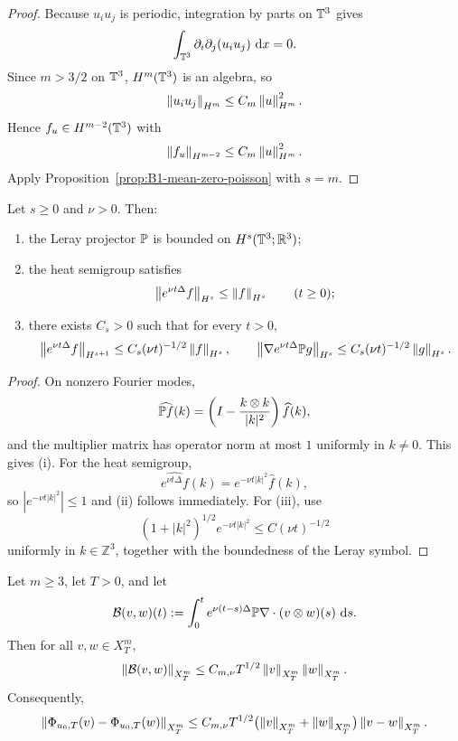 \begin{proof}
Because $u_i u_j$ is periodic, integration by parts on $\mathbb{T}^3$ gives
\[
\int_{\mathbb{T}^3}\partial_i\partial_j(u_i u_j)\,\,\mathrm{d} x = 0.
\]
Since $m>3/2$ on $\mathbb{T}^3$, $H^m(\mathbb{T}^3)$ is an algebra, so
\[
\left\lVert u_i u_j\right\rVert_{H^m}\le C_m \left\lVert u\right\rVert_{H^m}^2.
\]
Hence $f_u\in H^{m-2}(\mathbb{T}^3)$ with
\[
\left\lVert f_u\right\rVert_{H^{m-2}} \le C_m \left\lVert u\right\rVert_{H^m}^2.
\]
Apply Proposition~\ref{prop:B1-mean-zero-poisson} with $s=m$.
\end{proof}

\begin{manuallemma}
\label{lem:B3-semigroup-leray}
Let $s\ge 0$ and $\nu>0$. Then:
\begin{enumerate}[label=(\roman*), leftmargin=2.2em]
\item the Leray projector $\mathbb{P}$ is bounded on $H^s(\mathbb{T}^3;\mathbb R^3)$;
\item the heat semigroup satisfies
\[
\left\lVert e^{\nu t\Delta}f\right\rVert_{H^s}\le \left\lVert f\right\rVert_{H^s}\qquad (t\ge 0);
\]
\item there exists $C_s>0$ such that for every $t>0$,
\[
\left\lVert e^{\nu t\Delta}f\right\rVert_{H^{s+1}}
\le C_s (\nu t)^{-1/2}\left\lVert f\right\rVert_{H^s},
\qquad
\left\lVert \nabla e^{\nu t\Delta}\mathbb{P} g\right\rVert_{H^s}
\le C_s (\nu t)^{-1/2}\left\lVert g\right\rVert_{H^s}.
\]
\end{enumerate}
\end{manuallemma}

\begin{proof}
On nonzero Fourier modes,
\[
\widehat{\mathbb{P} f}(k)=\left(I-\frac{k\otimes k}{|k|^2}\right)\widehat f(k),
\]
and the multiplier matrix has operator norm at most $1$ uniformly in $k\neq 0$. This gives (i).
For the heat semigroup,
\[
\widehat{e^{\nu t\Delta}f}(k)=e^{-\nu t|k|^2}\widehat f(k),
\]
so $|e^{-\nu t|k|^2}|\le 1$ and (ii) follows immediately. For (iii), use
\[
(1+|k|^2)^{1/2}e^{-\nu t|k|^2}\le C(\nu t)^{-1/2}
\]
uniformly in $k\in\mathbb Z^3$, together with the boundedness of the Leray symbol.
\end{proof}

\begin{manualproposition}
\label{prop:B4-mild-bilinear}
Let $m\ge 3$, let $T>0$, and let
\[
\mathcal B(v,w)(t):=\int_0^t e^{\nu (t-s)\Delta}\mathbb{P}\nabla\cdot(v\otimes w)(s)\,\,\mathrm{d} s.
\]
Then for all $v,w\in X_T^m$,
\[
\left\lVert \mathcal B(v,w)\right\rVert_{X_T^m}
\le C_{m,\nu} T^{1/2}\left\lVert v\right\rVert_{X_T^m}\left\lVert w\right\rVert_{X_T^m}.
\]
Consequently,
\[
\left\lVert \Phi_{u_0,T}(v)-\Phi_{u_0,T}(w)\right\rVert_{X_T^m}
\le
C_{m,\nu}T^{1/2}
\bigl(\left\lVert v\right\rVert_{X_T^m}+\left\lVert w\right\rVert_{X_T^m}\bigr)
\left\lVert v-w\right\rVert_{X_T^m}.
\]
\end{manualproposition}

